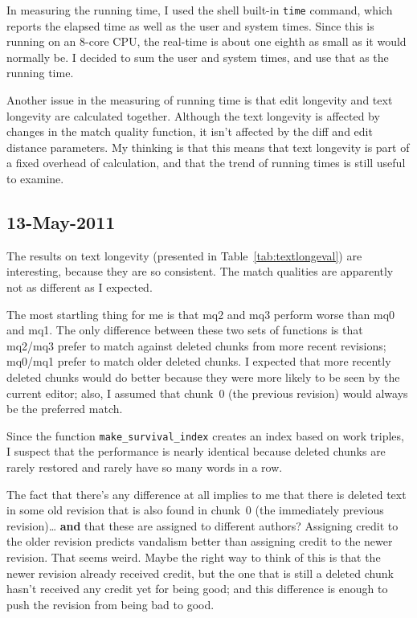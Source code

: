 In measuring the running time, I used the shell built-in
\texttt{time} command, which reports the elapsed time as well
as the user and system times.
Since this is running on an 8-core CPU, the real-time is about
one eighth as small as it would normally be.
I decided to sum the user and system times, and use that as
the running time.

Another issue in the measuring of running time is that
edit longevity and text longevity are calculated together.
Although the text longevity is affected by changes in the
match quality function, it isn't affected by the diff and
edit distance parameters.
My thinking is that this means that text longevity is part
of a fixed overhead of calculation, and that the trend
of running times is still useful to examine.





\subsection{13-May-2011}

The results on text longevity
(presented in Table~\ref{tab:textlongeval})
are interesting, because they are so consistent.
The match qualities are apparently not as different
as I expected.

The most startling thing for me is that mq2 and mq3
perform worse than mq0 and mq1.
The only difference between these two sets of functions
is that mq2/mq3 prefer to match against deleted chunks from
more recent revisions; mq0/mq1 prefer to match older deleted chunks.
I expected that more recently deleted chunks would do better
because they were more likely to be seen by the current editor;
also, I assumed that chunk~0 (the previous revision) would always
be the preferred match.

Since the function \texttt{make\_survival\_index} creates
an index based on work triples, I suspect that the performance
is nearly identical because deleted chunks are rarely restored
and rarely have so many words in a row.

The fact that there's any difference at all implies to me
that there is deleted text in some old revision that is
also found in chunk~0 (the immediately previous revision)\ldots
\textbf{and} that these are assigned to different authors?
Assigning credit to the older revision predicts vandalism
better than assigning credit to the newer revision.
That seems weird.
Maybe the right way to think of this is that the newer revision
already received credit, but the one that is still a deleted
chunk hasn't received any credit yet for being good;
and this difference is enough to push the revision from
being bad to good.

